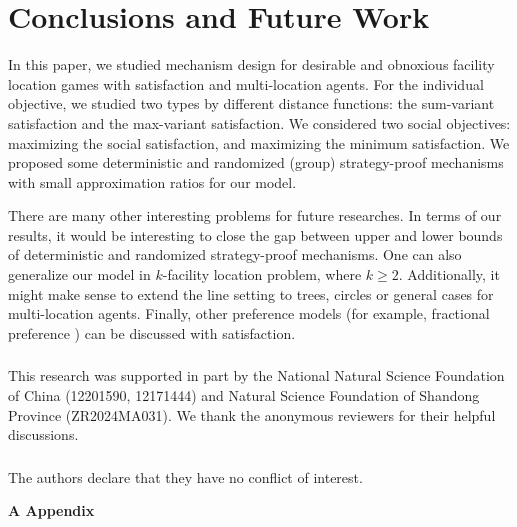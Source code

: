 \documentclass[runningheads]{11llncst}
\begin{document}
\section{Conclusions and Future Work}
In this paper, we studied  mechanism design for desirable and obnoxious facility location games with satisfaction and multi-location agents. For the individual objective, we studied two types by different distance functions:  the sum-variant satisfaction and the max-variant satisfaction. We considered two social objectives: maximizing  the social satisfaction, and maximizing the minimum satisfaction. We proposed some deterministic and randomized (group) strategy-proof mechanisms with small approximation ratios for our model. 

There are many other interesting problems for future researches. In terms of our results, it would be interesting to  close the gap between upper and lower bounds of  deterministic and randomized strategy-proof mechanisms. One can also generalize our model in $k$-facility location problem, where $k \geq 2$. Additionally, it might make sense to extend the line setting to trees, circles or general cases for  multi-location agents. Finally, other preference models (for example,  fractional preference \cite{fong2018facility}) can be discussed  with satisfaction. 
\subsubsection{\ackname} This research was supported in part by the National Natural Science Foundation of China (12201590, 12171444) and Natural Science Foundation of Shandong Province (ZR2024MA031). We thank the anonymous reviewers  for their helpful discussions.

\subsubsection{\discintname} The authors declare that they have no conflict of interest. 



\newpage
\noindent
{\large\bfseries A Appendix}
\vspace{0.5cm}
\end{document}
